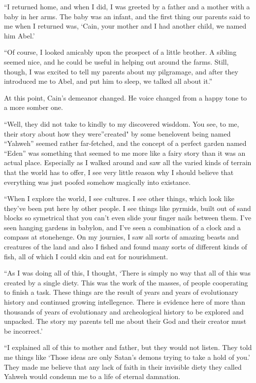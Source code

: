 \documentclass[12pt,twoside,titlepage]{report}
\begin{document}
``I returned home, and when I did, I was greeted by a father and a
mother with a baby in her arms. The baby was an infant, and the first
thing our parents said to me when I returned was, `Cain, your mother and
I had another child, we named him Abel.'

``Of course, I looked amicably upon the prospect of a little brother. A
sibling seemed nice, and he could be useful in helping out around the
farms. Still, though, I was excited to tell my parents about my
pilgramage, and after they introduced me to Abel, and put him to sleep,
we talked all about it.''

At this point, Cain's demeanor changed. He voice changed from a happy
tone to a more somber one.

``Well, they did not take to kindly to my discovered wisddom. You see,
to me, their story about how they were''created" by some benelovent
being named ``Yahweh'' seemed rather far-fetched, and the concept of a
perfect garden named ``Eden'' was something that seemed to me more like
a fairy story than it was an actual place. Especially as I walked around
and saw all the varied kinds of terrain that the world has to offer, I
see very little reason why I should believe that everything was just
poofed somehow magically into existance.

``When I explore the world, I see cultures. I see other things, which
look like they've been put here by other people. I see things like
pyrmids, built out of sand blocks so symetrical that you can't even
slide your finger nails between them. I've seen hanging gardens in
babylon, and I've seen a combination of a clock and a compass at
stonehenge. On my journies, I saw all sorts of amazing beasts and
creatures of the land and also I fished and found many sorts of
different kinds of fish, all of which I could skin and eat for
nourishment.

``As I was doing all of this, I thought, `There is simply no way that
all of this was created by a single diety. This was the work of the
masses, of people cooperating to finish a task. These things are the
result of years and years of evolutionary history and continued growing
intellegence. There is evidence here of more than thousands of years of
evolutionary and archeological history to be explored and unpacked. The
story my parents tell me about their God and their creator must be
incorrect.'

``I explained all of this to mother and father, but they would not
listen. They told me things like `Those ideas are only Satan's demons
trying to take a hold of you.' They made me believe that any lack of
faith in their invisible diety they called Yahweh would condemn me to a
life of eternal damnation.
\end{document}
